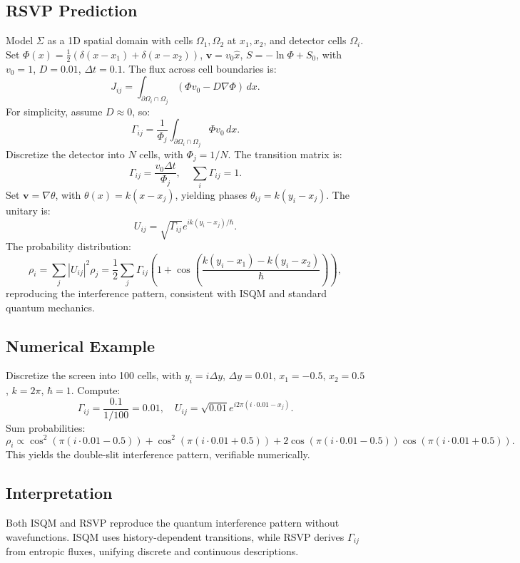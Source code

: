 \documentclass[12pt]{article}
\begin{document}
{\subsection{RSVP Prediction}

Model \(\Sigma\) as a 1D spatial domain with cells \(\Omega_1, \Omega_2\) at \(x_1, x_2\), and detector cells \(\Omega_i\). Set \(\Phi(x) = \frac{1}{2} (\delta(x - x_1) + \delta(x - x_2))\), \(\mathbf{v} = v_0 \hat{x}\), \(S = -\ln \Phi + S_0\), with \(v_0 = 1\), \(D = 0.01\), \(\Delta t = 0.1\). The flux across cell boundaries is:
\[
J_{ij} = \int_{\partial \Omega_i \cap \Omega_j} (\Phi v_0 - D \nabla \Phi) \, dx.
\]
For simplicity, assume \(D \approx 0\), so:
\[
\Gamma_{ij} = \frac{1}{\Phi_j} \int_{\partial \Omega_i \cap \Omega_j} \Phi v_0 \, dx.
\]
Discretize the detector into \(N\) cells, with \(\Phi_j = 1/N\). The transition matrix is:
\[
\Gamma_{ij} = \frac{v_0 \Delta t}{\Phi_j}, \quad \sum_i \Gamma_{ij} = 1.
\]
Set \(\mathbf{v} = \nabla \theta\), with \(\theta(x) = k (x - x_j)\), yielding phases \(\theta_{ij} = k (y_i - x_j)\). The unitary is:
\[
U_{ij} = \sqrt{\Gamma_{ij}} e^{i k (y_i - x_j) / \hbar}.
\]
The probability distribution:
\[
\rho_i = \sum_j |U_{ij}|^2 \rho_j = \frac{1}{2} \sum_j \Gamma_{ij} \left( 1 + \cos \left( \frac{k (y_i - x_1) - k (y_i - x_2)}{\hbar} \right) \right),
\]
reproducing the interference pattern, consistent with ISQM and standard quantum mechanics.

\subsection{Numerical Example}

Discretize the screen into 100 cells, with \(y_i = i \Delta y\), \(\Delta y = 0.01\), \(x_1 = -0.5\), \(x_2 = 0.5\), \(k = 2\pi\), \(\hbar = 1\). Compute:
\[
\Gamma_{ij} = \frac{0.1}{1/100} = 0.01, \quad U_{ij} = \sqrt{0.01} e^{i 2\pi (i \cdot 0.01 - x_j)}.
\]
Sum probabilities:
\[
\rho_i \propto \cos^2 \left( \pi (i \cdot 0.01 - 0.5) \right) + \cos^2 \left( \pi (i \cdot 0.01 + 0.5) \right) + 2 \cos \left( \pi (i \cdot 0.01 - 0.5) \right) \cos \left( \pi (i \cdot 0.01 + 0.5) \right).
\]
This yields the double-slit interference pattern, verifiable numerically.

\subsection{Interpretation}

Both ISQM and RSVP reproduce the quantum interference pattern without wavefunctions. ISQM uses history-dependent transitions, while RSVP derives \(\Gamma_{ij}\) from entropic fluxes, unifying discrete and continuous descriptions.

}
\end{document}
